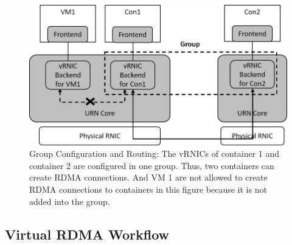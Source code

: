 


\begin{figure}[!ht]
	\centering
	\includegraphics[width=1.0\linewidth]{images/route-config}
	\caption{Group Configuration and Routing: The vRNICs of container 1 and container 2 are configured in one group. Thus, two containers can create RDMA connections. And VM 1 are not allowed to create RDMA connections to containers in this figure because it is not added into the group. }
	\label{fig:route-config}
\end{figure}


\subsection{Virtual RDMA Workflow}


